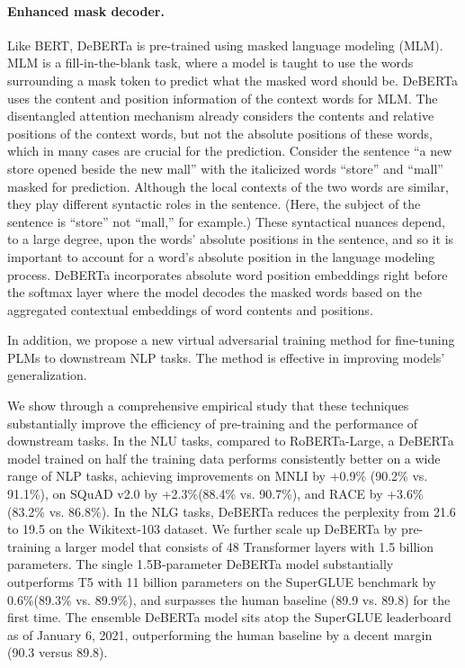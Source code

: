 \documentclass{article}
\begin{document}
\paragraph{Enhanced mask decoder.}
Like BERT, DeBERTa is pre-trained using masked language modeling (MLM). MLM is a fill-in-the-blank task, where a model is taught to use the words surrounding a mask token to predict what the masked word should be. DeBERTa uses the content and position information of the context words for MLM. The disentangled attention mechanism already considers the contents and relative positions of the context words, but not the absolute positions of these words, which in many cases are crucial for the prediction.
Consider the sentence “a new store opened beside the new mall” with the italicized words “store” and “mall” masked for prediction. Although the local contexts of the two words are similar, they play different syntactic roles in the sentence. (Here, the subject of the sentence is “store” not “mall,” for example.) These syntactical nuances depend, to a large degree, upon the words’ absolute positions in the sentence, and so it is important to account for a word’s absolute position in the language modeling process. DeBERTa incorporates absolute word position embeddings right before the softmax layer where the model decodes the masked words based on the aggregated contextual embeddings of word contents and positions.













In addition, we propose a new virtual adversarial training method for fine-tuning PLMs to downstream NLP tasks. The method is effective in improving models’ generalization.



We show through a comprehensive empirical study that these techniques substantially improve the efficiency of pre-training and the performance of downstream tasks. 
In the NLU tasks, compared to RoBERTa-Large, a DeBERTa model trained on half the training data performs consistently better on a wide range of NLP tasks, 
achieving improvements on MNLI by +0.9\% (90.2\% vs. 91.1\%), on SQuAD v2.0 by +2.3\%(88.4\% vs. 90.7\%), and RACE by +3.6\% (83.2\% vs. 86.8\%). 
In the NLG tasks, DeBERTa reduces the perplexity from 21.6 to 19.5 on the Wikitext-103 dataset. 
We further scale up DeBERTa by pre-training a larger model that consists of 48 Transformer layers with 1.5 billion parameters. 
The single 1.5B-parameter DeBERTa model substantially outperforms T5 with 11 billion parameters on the SuperGLUE benchmark \citep{wang2019superglue} by 0.6\%(89.3\% vs. 89.9\%), and surpasses the human baseline (89.9 vs. 89.8) for the first time.
The ensemble DeBERTa model sits atop the SuperGLUE leaderboard as of January 6, 2021, outperforming the human baseline by a decent margin (90.3 versus 89.8). 
 
\end{document}
